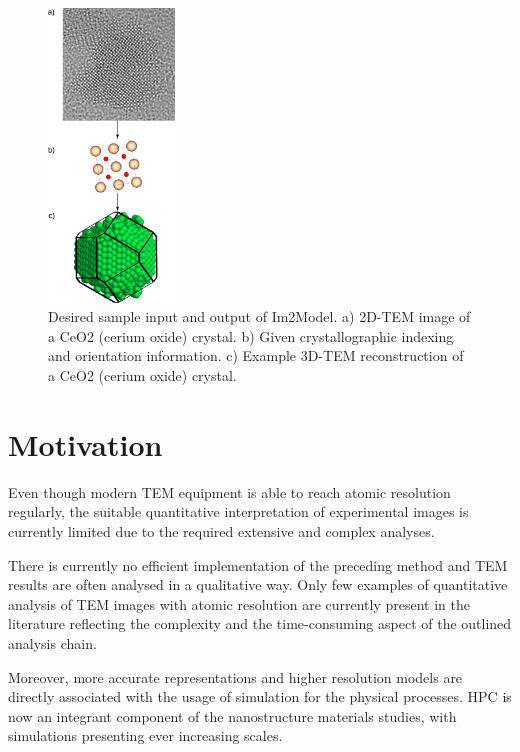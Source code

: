 \documentclass[
  oneside,
  11pt, a4paper,
  footinclude=true,
  headinclude=true,
  cleardoublepage=empty
]{scrbook}
\begin{document}
\begin{figure}[h!]
	\begin{center}
	
	\includegraphics[width=0.3\textwidth]{img/Im2Model_goal.png}
			\caption[Desired sample input and output of Im2Model]{Desired sample input and output of Im2Model.\splitter
			\newline
			a) 2D-TEM image of a CeO2 (cerium oxide) crystal.\newline
			b) Given crystallographic indexing and orientation information.\newline
			c) Example 3D-TEM reconstruction of a CeO2 (cerium oxide) crystal.}
	\label{fig:tem_2_atom_Ce02}
		\end{center}
	\end{figure}
	
 






	\section{Motivation}
	
	Even though modern TEM equipment is able to reach atomic
resolution regularly, the suitable quantitative interpretation of experimental images is currently limited
due to the required extensive and complex analyses.\par 

	There is currently no efficient implementation of the preceding method and TEM results are often analysed in a
qualitative way. 
Only few examples of quantitative analysis of TEM images with atomic resolution are
currently present in the literature %
reflecting the complexity and the time-consuming aspect of the
outlined analysis chain.\par 
Moreover, more accurate representations and higher resolution models are directly associated with the usage of simulation for the physical processes. HPC is now an integrant component of the nanostructure materials studies, with simulations presenting ever increasing scales.\par
\end{document}
